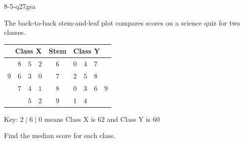\begin{practiceQuestion}{8-5-q27}{gsa}
\begin{questionText}
The back-to-back stem-and-leaf plot compares scores on a science quiz for two classes.

\begin{center}
\begin{tabular}{r c l}
\textbf{Class X} & \textbf{Stem} & \textbf{Class Y} \\
\hline
$8 \quad 5 \quad 2$ & $6$ & $0 \quad 4 \quad 7$ \\
$9 \quad 6 \quad 3 \quad 0$ & $7$ & $2 \quad 5 \quad 8$ \\
$7 \quad 4 \quad 1$ & $8$ & $0 \quad 3 \quad 6 \quad 9$ \\
$5 \quad 2$ & $9$ & $1 \quad 4$ \\
\end{tabular}
\end{center}

Key: $2 \mid 6 \mid 0$ means Class X is $62$ and Class Y is $60$

Find the median score for each class.
\end{questionText}
\end{practiceQuestion}
